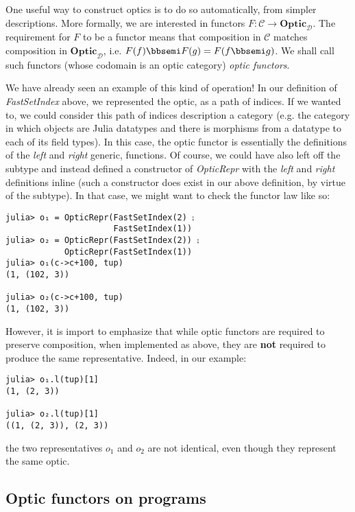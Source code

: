 \documentclass[letterpaper, 10 pt, conference]{ieeeconf}  %
\newcommand{\Optic}{\textbf{Optic}}
\begin{document}
One useful way to construct optics is to do so automatically, from simpler
descriptions. More formally, we are interested in functors $F: \mathcal{C} \to \Optic_{\mathcal{D}}$.
The requirement for $F$ to be a functor means that composition in $\mathcal{C}$
matches composition in $\Optic_{\mathcal{D}}$, i.e. $F(f) \bbsemi F(g) = F(f \bbsemi g)$.
We shall call such functors (whose codomain is an optic category) \textit{optic functors}.

We have already seen an example of this kind of operation! In our definition
of \textit{FastSetIndex} above, we represented the optic, as a path of indices.
If we wanted to, we could consider this path of indices description a category
(e.g. the category in which objects are Julia datatypes and there is morphisms
from a datatype to each of its field types). In this case, the
optic functor is essentially the definitions of the \textit{left} and
\textit{right} generic, functions. Of course, we could have also left off the
subtype and instead defined a constructor of \textit{OpticRepr} with the
\textit{left} and \textit{right} definitions inline (such a constructor does
exist in our above definition, by virtue of the subtype). In that case, we
might want to check the functor law like so:

\begin{verbatim}
julia> o₁ = OpticRepr(FastSetIndex(2) ⨟
                      FastSetIndex(1))
julia> o₂ = OpticRepr(FastSetIndex(2)) ⨟
            OpticRepr(FastSetIndex(1))
julia> o₁(c->c+100, tup)
(1, (102, 3))

julia> o₂(c->c+100, tup)
(1, (102, 3))
\end{verbatim}

However, it is import to emphasize that while optic functors are required to
preserve composition, when implemented as above, they are \textbf{not} required
to produce the same representative. Indeed, in our example:

\begin{verbatim}
julia> o₁.l(tup)[1]
(1, (2, 3))

julia> o₂.l(tup)[1]
((1, (2, 3)), (2, 3))
\end{verbatim}

the two representatives $o_1$ and $o_2$ are not identical, even though they
represent the same optic.

\subsection{Optic functors on programs}
\end{document}
